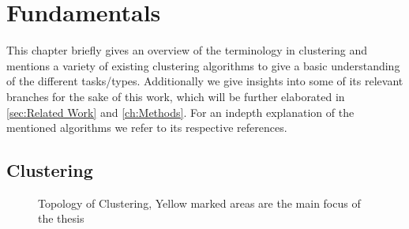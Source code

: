 \chapter{Fundamentals}

This chapter briefly gives an overview of the terminology in clustering and mentions a variety of existing clustering algorithms to give a basic understanding of the different tasks/types. Additionally we give insights into some of its relevant branches for the sake of this work, which will be further elaborated in \autoref{sec:Related Work} and \autoref{ch:Methods}. For an indepth explanation of the mentioned algorithms we refer to its respective references.

\section{Clustering}\label{sec:clu}

\begin{figure}
    \centering
    \caption{Topology of Clustering, Yellow marked areas are the main focus of the thesis}
    \label{fig:my_label}
\end{figure}

